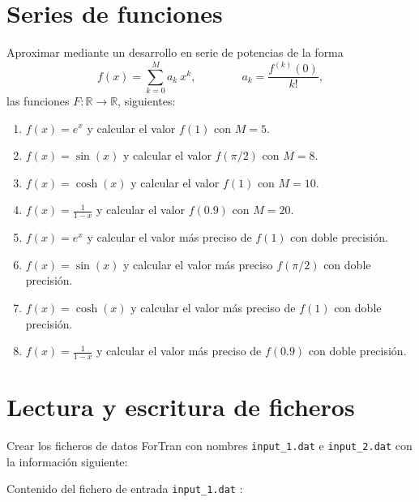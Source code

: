    \section{Series de funciones   \label{series_funciones} }
   
   
   Aproximar  mediante un desarrollo en serie de potencias de la forma
   \[  f(x) = \sum_{k=0} ^M a_k \  x^k, \qquad \qquad a_k = \frac{  f^{(k)} (0)  }{ k! },  \]  
   las funciones $F : \mathbb{R} \rightarrow \mathbb{R}$, siguientes:    
   \begin{enumerate}
    \item $f(x) = e^x$ y calcular el valor $ f(1) $ con $ M=5$.      
    \item $f(x) = \sin(x)$ y calcular el valor $ f(\pi/2)$  con $M=8$.      
    \item $f(x) = \cosh(x)$ y calcular el valor $ f(1) $  con $M=10$. 
    \item $f(x) = \displaystyle \frac{1}{1 - x}$ y calcular el valor $ f(0.9) $  con $M=20$.  
    \item $f(x) = e^x$ y calcular el valor más preciso de  $ f(1) $ con doble precisión.        
    \item $f(x) = \sin(x)$ y calcular el valor más preciso  $ f(\pi/2)$ con doble precisión.   
    \item $f(x) = \cosh(x)$ y calcular el valor más preciso de  $ f(1) $ con doble precisión.
    \item $f(x) = \displaystyle \frac{1}{1 - x}$ y calcular el valor  más preciso de $ f(0.9) $ con doble precisión.
    
   \end{enumerate}
   
   
   
   \section{Lectura y escritura de ficheros  \label{files_IO} }
   
   
   Crear los ficheros de datos ForTran con nombres  \verb|input_1.dat| e 
   \verb|input_2.dat| con la informaci\'on siguiente:
   
   \vspace{1cm}
   
   Contenido del fichero de entrada \verb|input_1.dat| :
   
